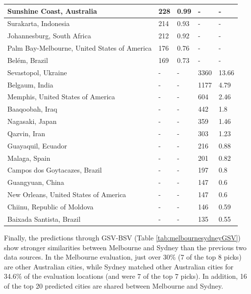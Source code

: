 \documentclass[sageh,times]{sagej}
\begin{document}
\begin{table}[!htbp]
\begin{tabular}{| l | l |l| l | l|}
Sunshine Coast, Australia & 228 & 0.99 &-&- \\ \hline
Surakarta, Indonesia & 214 & 0.93 &-&- \\ \hline
Johannesburg, South Africa & 212 & 0.92 &-&- \\ \hline
Palm Bay-Melbourne, United States of America & 176 & 0.76 &-&- \\ \hline
Bel\'{e}m, Brazil & 169 & 0.73 &-&- \\ \hline
Sevastopol, Ukraine &-&- & 3360 & 13.66\\ \hline
Belgaum, India &-&- & 1177 & 4.79\\ \hline
Memphis, United States of America &-&- & 604 & 2.46\\ \hline
Baaqoobah, Iraq &-&- & 442 & 1.8\\ \hline
Nagasaki, Japan &-&- & 359 & 1.46\\ \hline
Qazvin, Iran &-&- & 303 & 1.23\\ \hline
Guayaquil, Ecuador &-&- & 216 & 0.88\\ \hline
Malaga, Spain &-&- & 201 & 0.82\\ \hline
Campos dos Goytacazes, Brazil &-&- & 197 & 0.8\\ \hline
Guangyuan, China &-&- & 147 & 0.6\\ \hline
New Orleans, United States of America &-&- & 147 & 0.6\\ \hline
Chiinu, Republic of Moldova &-&- & 146 & 0.59\\ \hline
Baixada Santista, Brazil &-&- & 135 & 0.55\\ \hline
\end{tabular}
\end{table}

Finally, the predictions through GSV-BSV (Table \ref{tab:melbournesydneyGSV}) show stronger similarities between Melbourne and Sydney than the previous two data sources. In the Melbourne evaluation, just over 30\% (7 of the top 8 picks) are other Australian cities, while Sydney matched other Australian cities for 34.6\% of the evaluation locations (and were 7 of the top 7 picks). In addition, 16 of the top 20 predicted cities are shared between Melbourne and Sydney. 
\end{document}
